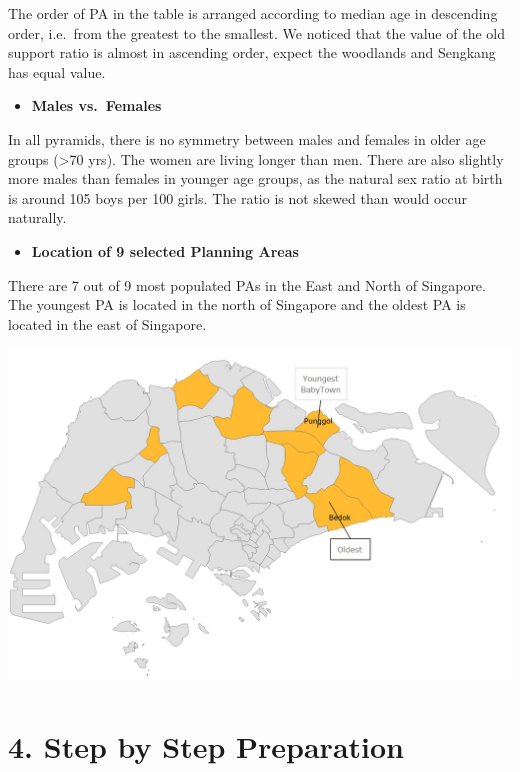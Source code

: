 \documentclass[
  letterpaper,
  DIV=11,
  numbers=noendperiod,
  oneside]{scrartcl}
\providecommand{\tightlist}{%
  \setlength{\itemsep}{0pt}\setlength{\parskip}{0pt}}\usepackage{longtable,booktabs,array}
\begin{document}
The order of PA in the table is arranged according to median age in
descending order, i.e.~from the greatest to the smallest. We noticed
that the value of the old support ratio is almost in ascending order,
expect the woodlands and Sengkang has equal value.

\begin{itemize}
\tightlist
\item
  \textbf{Males vs.~Females}
\end{itemize}

In all pyramids, there is no symmetry between males and females in older
age groups (\textgreater70 yrs). The women are living longer than men.
There are also slightly more males than females in younger age groups,
as the natural sex ratio at birth is around 105 boys per 100 girls. The
ratio is not skewed than would occur naturally.

\begin{itemize}
\tightlist
\item
  \textbf{Location of 9 selected Planning Areas}
\end{itemize}

There are 7 out of 9 most populated PAs in the East and North of
Singapore. The youngest PA is located in the north of Singapore and the
oldest PA is located in the east of Singapore.

\includegraphics{images/location of PA-02.jpg}

\hypertarget{step-by-step-preparation}{%
\section{4. Step by Step Preparation}\label{step-by-step-preparation}}
\end{document}
